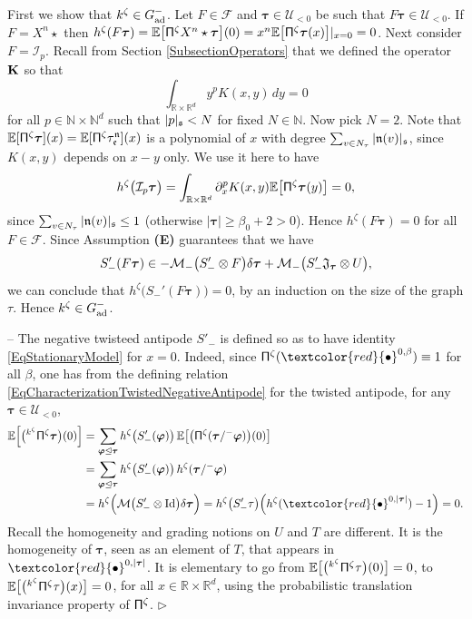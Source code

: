 \documentclass[10pt, reqno]{amsart}
\numberwithin{subsection}{section}
\numberwithin{subsubsection}{subsection}
\numberwithin{equation}{section} %
\newenvironment{Dem}[1][\unskip]{%
    \begin{list}{\hspace{1.15cm}{\sf \textbf{{\small Proof #1 --}}}}{%
        \setlength{\topsep}{0pt}%
        \setlength{\leftmargin}{0pt}%
        \setlength{\rightmargin}{0pt}%
        \setlength{\listparindent}{0pt}%
        \setlength{\itemindent}{0pt}%
        \setlength{\parsep}{0pt}%
        \addtolength{\leftmargin}{0pt}%
        \addtolength{\rightmargin}{0pt}%
    } \item }{\hfill $\rhd$\end{list}\smallskip}
\theoremstyle{mystyle}
\theoremstyle{mystyle2}
\theoremstyle{mystyle3}
\newcommand{\mcF}{\boldsymbol{p}}
\newcommand{\bstau}{\boldsymbol{\tau}}
\newcommand{\bsvarphi}{\boldsymbol{\varphi}}
\newcommand{\ssk}{\smallskip}
\newcommand\bbE{\mathbb{E}}
\newcommand\bbN{\mathbb{N}}
\newcommand\bbR{\mathbb{R}}
\renewcommand{\mcF}{\mathcal{F}}
\newcommand{\mcI}{\mathcal{I}}
\newcommand{\mcM}{\mathcal{M}}
\newcommand\mcU{\mathcal U}
\begin{document}
\begin{Dem}
First we show that $k^\zeta\in G_{\text{\rm ad}}^-$. Let $F\in\mcF$ and $\bstau\in\mcU_{<0}$ be such that $F\bstau\in\mcU_{<0}$. If $F=X^n\star$ then $h^\zeta(F\bstau)=\bbE\big[{\sf \Pi}^\zeta X^n\star\bstau\big](0)=x^n\bbE\big[{\sf \Pi}^\zeta\bstau(x)\big]|_{x=0}=0$. Next consider $F=\mcI_p$. Recall from Section \ref{SubsectionOperators} that we defined the operator $\bf K$ so that 
$$
\int_{\bbR\times\bbR^d} y^pK(x,y)\,dy = 0
$$
for all $p\in\bbN\times\bbN^d$ such that $\vert p\vert_\frak{s}<N$ for fixed $N\in\bbN$. Now pick $N=2$. Note that $\bbE[{\sf\Pi}^\zeta\bstau](x)=\bbE[{\sf\Pi}^\zeta\tau_{\frak{e}}^{\frak{n}}](x)$ is a polynomial of $x$ with degree $\sum_{v\in N_\tau}|\frak{n}(v)|_{\frak{s}}$, since $K(x,y)$ depends on $x-y$ only. We use it here to have
$$
h^\zeta\big(\mcI_p\bstau\big) = \int_{\bbR\times\bbR^d}\partial_x^pK(x,y)\bbE\big[{\sf \Pi}^\zeta\bstau(y)\big]=0,
$$
since $\sum_{v\in N_\tau}|\frak{n}(v)|_{\frak{s}}\le1$ (otherwise $|\bstau|\ge\beta_0+2>0$). Hence $h^\zeta(F\bstau)=0$ for all $F\in\mcF$. Since Assumption \textbf{\textsf{(E)}} guarantees that we have
\begin{align*}
S_-'(F\bstau) \in -\mcM_-\big(S_-'\otimes F\big)\delta\bstau+\mcM_-\big(S_-'\frak{J}_{\bstau}\otimes U\big),
\end{align*}
we can conclude that $h^\zeta\big(S_-'(F\bstau)\big)=0$, by an induction on the size of the graph $\tau$. Hence $k^\zeta\in G_{\text{\rm ad}}^-$.

\ssk

-- The negative twisteed antipode $S'_-$ is defined so as to have identity \eqref{EqStationaryModel} for $x=0$. Indeed, since ${\sf\Pi}^{\zeta}(\textcolor{red}{\bullet}^{0,\beta})\equiv1$ for all $\beta$, one has from 
the defining relation \eqref{EqCharacterizationTwistedNegativeAntipode} for the twisted antipode, for any $\bstau\in\mcU_{<0}$,
\begin{align*} 
\bbE\Big[\big({}^{k^\zeta}{\sf \Pi}^\zeta\bstau\big)(0)\Big]
&=\sum_{\bsvarphi\trianglelefteq\bstau} h^\zeta\big(S_-'(\bsvarphi)\big)\, \bbE\big[\big({\sf\Pi}^\zeta(\bstau/^-\bsvarphi)\big)(0)\big]\\
&= \sum_{\bsvarphi\trianglelefteq\bstau} h^\zeta\big(S'_-(\bsvarphi)\big)\,h^\zeta(\bstau/^-\bsvarphi)\\
&= h^\zeta\Big( \mcM\big(S'_-\otimes \textrm{Id}\big)\delta\bstau\Big) = h^\zeta\big(S_-'\tau\big)\Big(h^\zeta(\textcolor{red}{\bullet}^{0,\vert\bstau\vert})-1\Big) = 0.
\end{align*}
Recall the homogeneity and grading notions on $U$ and $T$ are different. It is the homogeneity of $\bstau$, seen as an element of $T$, that appears in $\textcolor{red}{\bullet}^{0,\vert\bstau\vert}$. It is elementary to 
go from $\bbE\big[\big({}^{k^\zeta}{\sf \Pi}^\zeta\tau\big)(0)\big]=0$, 
to $\bbE\big[\big({}^{k^\zeta}{\sf \Pi}^\zeta\tau\big)(x)\big]=0$, for all $x\in\bbR\times\bbR^d$, using the probabilistic translation invariance property of ${\sf \Pi}^\zeta$.
\end{Dem}
\end{document}
